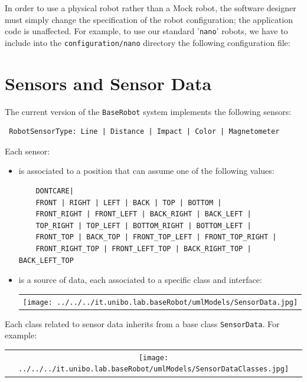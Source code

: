 In order to use a physical robot rather than a Mock robot, the software designer must simply change the specification of the robot configuration; the application code is unaffected. For example, to use our standard '\texttt{nano}' robots, we have to include into the \texttt{configuration/nano} directory the following configuration file:



\newpage 
\section{Sensors and Sensor Data}
 
The current version of the \texttt{BaseRobot} system implements the following sensors:
\begin{verbatim}
 RobotSensorType: Line | Distance | Impact | Color | Magnetometer  
\end{verbatim} 

Each sensor:
\begin{itemize}
\item is associated to a position that can assume one of the following values:
\begin{verbatim}
	DONTCARE| 
	FRONT | RIGHT | LEFT | BACK | TOP | BOTTOM |
	FRONT_RIGHT | FRONT_LEFT | BACK_RIGHT | BACK_LEFT | 
	TOP_RIGHT | TOP_LEFT | BOTTOM_RIGHT | BOTTOM_LEFT |
	FRONT_TOP | BACK_TOP | FRONT_TOP_LEFT | FRONT_TOP_RIGHT |
	FRONT_RIGHT_TOP | FRONT_LEFT_TOP | BACK_RIGHT_TOP | BACK_LEFT_TOP 
\end{verbatim}
\item is a source of data, each associated to a specific class and interface:     
\begin{center}
\begin{tabular}{ c }
     \texttt{[image: ../../../it.unibo.lab.baseRobot/umlModels/SensorData.jpg]}\\
\end{tabular} 
\end{center}
\end{itemize}

Each class related to sensor data inherits from a base class \texttt{SensorData}. For example:

\begin{center}
\begin{tabular}{ c }
     \texttt{[image: ../../../it.unibo.lab.baseRobot/umlModels/SensorDataClasses.jpg]}\\
\end{tabular} 
\end{center}


